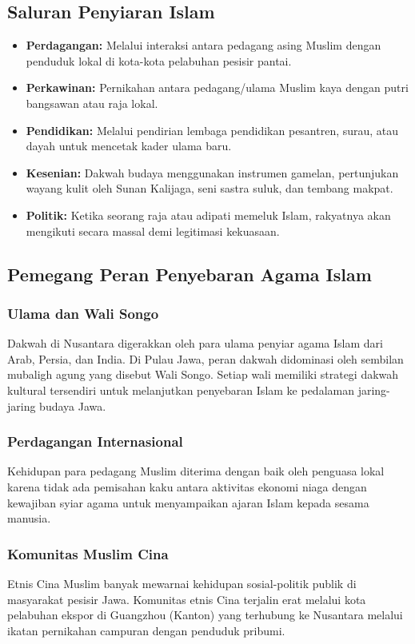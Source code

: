\documentclass[12pt, a4paper]{article}
\begin{document}
\subsection{Saluran Penyiaran Islam}
\begin{itemize}
	\item \textbf{Perdagangan:} Melalui interaksi antara pedagang asing Muslim dengan penduduk lokal di kota-kota pelabuhan pesisir pantai.
	\item \textbf{Perkawinan:} Pernikahan antara pedagang/ulama Muslim kaya dengan putri bangsawan atau raja lokal.
	\item \textbf{Pendidikan:} Melalui pendirian lembaga pendidikan pesantren, surau, atau dayah untuk mencetak kader ulama baru.
	\item \textbf{Kesenian:} Dakwah budaya menggunakan instrumen gamelan, pertunjukan wayang kulit oleh Sunan Kalijaga, seni sastra suluk, dan tembang makpat.
	\item \textbf{Politik:} Ketika seorang raja atau adipati memeluk Islam, rakyatnya akan mengikuti secara massal demi legitimasi kekuasaan.
\end{itemize}

\subsection{Pemegang Peran Penyebaran Agama Islam}
\subsubsection{Ulama dan Wali Songo}
Dakwah di Nusantara digerakkan oleh para ulama penyiar agama Islam dari Arab, Persia, dan India. Di Pulau Jawa, peran dakwah didominasi oleh sembilan mubaligh agung yang disebut Wali Songo. Setiap wali memiliki strategi dakwah kultural tersendiri untuk melanjutkan penyebaran Islam ke pedalaman jaring-jaring budaya Jawa.
\subsubsection{Perdagangan Internasional}
Kehidupan para pedagang Muslim diterima dengan baik oleh penguasa lokal karena tidak ada pemisahan kaku antara aktivitas ekonomi niaga dengan kewajiban syiar agama untuk menyampaikan ajaran Islam kepada sesama manusia.
\subsubsection{Komunitas Muslim Cina}
Etnis Cina Muslim banyak mewarnai kehidupan sosial-politik publik di masyarakat pesisir Jawa. Komunitas etnis Cina terjalin erat melalui kota pelabuhan ekspor di Guangzhou (Kanton) yang terhubung ke Nusantara melalui ikatan pernikahan campuran dengan penduduk pribumi.
\end{document}
